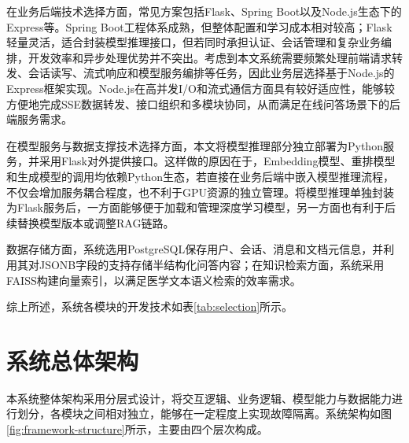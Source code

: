 在业务后端技术选择方面，常见方案包括Flask、Spring Boot以及Node.js生态下的Express等。Spring Boot工程体系成熟，但整体配置和学习成本相对较高；Flask轻量灵活，适合封装模型推理接口，但若同时承担认证、会话管理和复杂业务编排，开发效率和异步处理优势并不突出。考虑到本文系统需要频繁处理前端请求转发、会话读写、流式响应和模型服务编排等任务，因此业务层选择基于Node.js的Express框架实现。Node.js在高并发I/O和流式通信方面具有较好适应性，能够较方便地完成SSE数据转发、接口组织和多模块协同，从而满足在线问答场景下的后端服务需求。

在模型服务与数据支撑技术选择方面，本文将模型推理部分独立部署为Python服务，并采用Flask对外提供接口。这样做的原因在于，Embedding模型、重排模型和生成模型的调用均依赖Python生态，若直接在业务后端中嵌入模型推理流程，不仅会增加服务耦合程度，也不利于GPU资源的独立管理。将模型推理单独封装为Flask服务后，一方面能够便于加载和管理深度学习模型，另一方面也有利于后续替换模型版本或调整RAG链路。

数据存储方面，系统选用PostgreSQL保存用户、会话、消息和文档元信息，并利用其对JSONB字段的支持存储半结构化问答内容；在知识检索方面，系统采用FAISS构建向量索引，以满足医学文本语义检索的效率需求。

综上所述，系统各模块的开发技术如表\ref{tab:selection}所示。
\begin{table}[htbp]
    \caption{开发技术}
    \centering
    \label{tab:selection}
    
\end{table}

\section{系统总体架构}

本系统整体架构采用分层式设计，将交互逻辑、业务逻辑、模型能力与数据能力进行划分，各模块之间相对独立，能够在一定程度上实现故障隔离。系统架构如图\ref{fig:framework-structure}所示，主要由四个层次构成。

